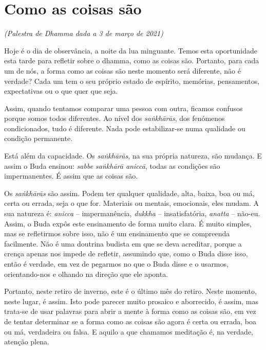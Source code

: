 \chapter{Como as coisas são}

\emph{(Palestra de Dhamma dada a 3 de março de 2021)}

Hoje é o dia de observância, a noite da lua minguante. Temos esta oportunidade
esta tarde para refletir sobre o dhamma, como as coisas são. Portanto, para cada
um de nós, a forma como as coisas são neste momento será diferente, não é
verdade? Cada um tem o seu próprio estado de espírito, memórias, pensamentos,
expectativas ou o que quer que seja.

Assim, quando tentamos comparar uma pessoa com outra, ficamos confusos porque
somos todos diferentes. Ao nível dos \emph{saṅkhārās}, dos fenómenos condicionados,
tudo é diferente. Nada pode estabilizar-se numa qualidade ou condição
permanente.

Está além da capacidade. Os \emph{saṅkhārās}, na sua própria natureza, são mudança. E
assim o Buda ensinou: \emph{sabbe saṅkhārā aniccā}, todas as condições são
impermanentes. É assim que as coisas são.

Os \emph{saṅkhārās} são assim. Podem ter qualquer qualidade, alta, baixa, boa ou má,
certa ou errada, seja o que for. Materiais ou mentais, emocionais, eles mudam. A
sua natureza é: \emph{anicca} -- impermanência, \emph{dukkha} -- insatisfatória, \emph{anatta} --
não-eu. Assim, o Buda expôs este ensinamento de forma muito clara. É muito
simples, mas se refletirmos sobre isso, não é um ensinamento que se compreenda
facilmente. Não é uma doutrina budista em que se deva acreditar, porque a crença
apenas nos impede de refletir, assumindo que, como o Buda disse isso, então é
verdade, em vez de pegarmos no que o Buda disse e o usarmos, orientando-nos e
olhando na direção que ele aponta.

Portanto, neste retiro de inverno, este é o último mês do retiro. Neste momento,
neste lugar, é assim. Isto pode parecer muito prosaico e aborrecido, é assim,
mas trata-se de usar palavras para abrir a mente à forma como as coisas são, em
vez de tentar determinar se a forma como as coisas são agora é certa ou errada,
boa ou má, verdadeira ou falsa. E aquilo a que chamamos meditação é, na verdade,
atenção plena.

